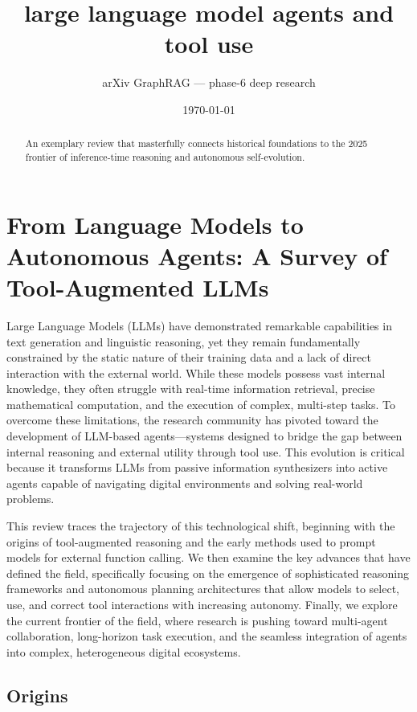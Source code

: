 \documentclass[11pt]{article}
\title{large language model agents and tool use}
\author{arXiv GraphRAG --- phase-6 deep research}
\date{\today}
\begin{document}
\maketitle

\begin{abstract}
An exemplary review that masterfully connects historical foundations to the 2025 frontier of inference-time reasoning and autonomous self-evolution.
\end{abstract}

\section{From Language Models to Autonomous Agents: A Survey of Tool-Augmented LLMs}

Large Language Models (LLMs) have demonstrated remarkable capabilities in text generation and linguistic reasoning, yet they remain fundamentally constrained by the static nature of their training data and a lack of direct interaction with the external world. While these models possess vast internal knowledge, they often struggle with real-time information retrieval, precise mathematical computation, and the execution of complex, multi-step tasks. To overcome these limitations, the research community has pivoted toward the development of LLM-based agents—systems designed to bridge the gap between internal reasoning and external utility through tool use. This evolution is critical because it transforms LLMs from passive information synthesizers into active agents capable of navigating digital environments and solving real-world problems.

This review traces the trajectory of this technological shift, beginning with the origins of tool-augmented reasoning and the early methods used to prompt models for external function calling. We then examine the key advances that have defined the field, specifically focusing on the emergence of sophisticated reasoning frameworks and autonomous planning architectures that allow models to select, use, and correct tool interactions with increasing autonomy. Finally, we explore the current frontier of the field, where research is pushing toward multi-agent collaboration, long-horizon task execution, and the seamless integration of agents into complex, heterogeneous digital ecosystems.

\subsection{Origins}
\end{document}
